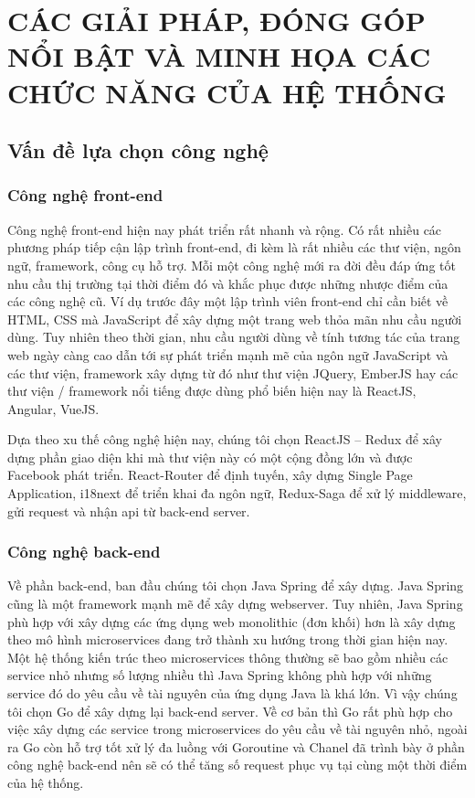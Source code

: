 \chapter{CÁC GIẢI PHÁP, ĐÓNG GÓP NỔI BẬT VÀ MINH HỌA CÁC
CHỨC NĂNG CỦA HỆ THỐNG}
\section{Vấn đề lựa chọn công nghệ}
\subsection{Công nghệ front-end}
Công nghệ front-end hiện nay phát triển rất nhanh và rộng.
Có rất nhiều các phương pháp tiếp cận lập trình front-end, đi kèm
là rất nhiều các thư viện, ngôn ngữ, framework,
công cụ hỗ trợ. Mỗi một công nghệ mới ra đời đều đáp ứng
tốt nhu cầu thị trường tại thời điểm đó và
khắc phục được những nhược điểm của các công nghệ cũ.
Ví dụ trước đây một lập trình viên front-end chỉ cần
biết về HTML, CSS mà JavaScript để xây dựng một trang web
thỏa mãn nhu cầu người dùng. Tuy nhiên theo thời gian, nhu cầu
người dùng về tính tương tác của trang web ngày càng cao dẫn
tới sự phát triển mạnh mẽ của ngôn ngữ JavaScript và các thư viện,
framework xây dựng từ đó như thư viện JQuery, EmberJS hay các
thư viện / framework nổi tiếng được dùng phổ biến hiện nay là
ReactJS, Angular, VueJS.

Dựa theo xu thế công nghệ hiện nay, chúng tôi chọn ReactJS – Redux để
xây dựng phần giao diện khi mà thư viện này có một cộng đồng lớn
và được Facebook phát triển. React-Router để định tuyến, xây dựng
Single Page Application, i18next để triển khai đa ngôn ngữ,
Redux-Saga để xử lý middleware,
gửi request và nhận api từ back-end server. 

\subsection{Công nghệ back-end}
Về phần back-end, ban đầu chúng tôi chọn Java Spring để xây dựng.
Java Spring cũng là một framework mạnh mẽ để xây dựng webserver.
Tuy nhiên, Java Spring phù hợp với xây dựng các ứng dụng web
monolithic (đơn khối) hơn là xây dựng theo mô hình microservices
đang trở thành xu hướng trong thời gian hiện nay. Một
hệ thống kiến trúc theo microservices thông thường sẽ
bao gồm nhiều các service nhỏ nhưng số lượng nhiều thì Java
Spring không phù hợp với những service đó do yêu cầu về tài
nguyên của ứng dụng Java là khá lớn. Vì vậy chúng tôi chọn
Go để xây dựng lại back-end server. Về cơ bản thì Go rất
phù hợp cho việc xây dựng các service trong microservices
do yêu cầu về tài nguyên nhỏ, ngoài ra Go còn hỗ trợ tốt xử
lý đa luồng với Goroutine và Chanel đã trình bày ở phần
công nghệ back-end nên
sẽ có thể tăng số request phục vụ tại cùng một thời điểm của hệ thống.

